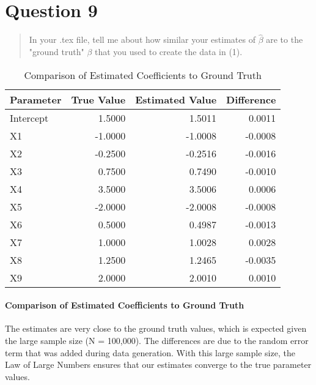 \documentclass{article}
\begin{document}
\section{Question 9}
\begin{quote}
\selectfont %
In your .tex file, tell me about how similar your estimates of $\hat{\beta}$ are to the "ground truth" $\beta$ that you used to create the data in (1).
\end{quote}

\begin{table}[htbp]
\centering
\caption{Comparison of Estimated Coefficients to Ground Truth}
\begin{tabular}{lrrr}
\hline
\textbf{Parameter} & \textbf{True Value} & \textbf{Estimated Value} & \textbf{Difference} \\
\hline
Intercept & 1.5000 & 1.5011 & 0.0011 \\
X1 & -1.0000 & -1.0008 & -0.0008 \\
X2 & -0.2500 & -0.2516 & -0.0016 \\
X3 & 0.7500 & 0.7490 & -0.0010 \\
X4 & 3.5000 & 3.5006 & 0.0006 \\
X5 & -2.0000 & -2.0008 & -0.0008 \\
X6 & 0.5000 & 0.4987 & -0.0013 \\
X7 & 1.0000 & 1.0028 & 0.0028 \\
X8 & 1.2500 & 1.2465 & -0.0035 \\
X9 & 2.0000 & 2.0010 & 0.0010 \\
\hline
\end{tabular}
\label{tab:coef_comparison}
\end{table}

\paragraph{Comparison of Estimated Coefficients to Ground Truth}
The estimates are very close to the ground truth values, which is expected given the large sample size (N = 100,000). The differences are due to the random error term that was added during data generation. With this large sample size, the Law of Large Numbers ensures that our estimates converge to the true parameter values.
\end{document}
